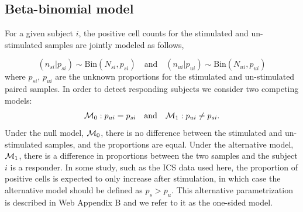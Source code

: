 \documentclass[useAMS,referee,usenatbib]{biom}
\begin{document}
\subsection{Beta-binomial model}
\label{s:DE}
For a given subject $i$, the positive cell counts for the stimulated and un-stimulated samples are jointly modeled as follows,

\begin{equation*}
(n_{si}|p_{si}) \sim \mathrm{Bin}(N_{si},p_{si})\quad \text{and}\quad (n_{ui}|p_{ui}) \sim \mathrm{Bin}(N_{ui},p_{ui})\label{eq:bino_likelihood}
\end{equation*}
where $p_{si}$, $p_{ui}$ are the unknown proportions for the stimulated and un-stimulated paired samples. In order to detect responding subjects we consider two competing models:
\begin{equation*}
{\cal M}_0: p_{ui}=p_{si}\quad \text{and}\quad {\cal M}_1: p_{ui}\ne p_{si}. \label{eq:models}
\end{equation*}
Under the null model, ${\cal M}_0$, there is no difference between the stimulated and un-stimulated samples, and the proportions are equal. Under the alternative model, ${\cal M}_1$, there is a difference in proportions between the two samples and the subject $i$ is a responder. In some study, such as the ICS data used here, the proportion of positive cells is expected to only increase after stimulation, in which case the alternative model should be defined as $p_s>p_u$. This alternative parametrization is described in Web Appendix B and we refer to it as the one-sided model.
\end{document}
